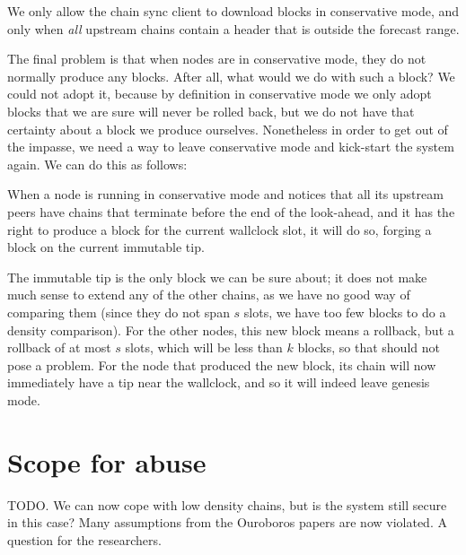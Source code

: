 \begin{definition}
\label{low-density:post-genesis-jump-condition}
We only allow the chain sync client to download blocks in conservative mode, and
only when \emph{all} upstream chains contain a header that is outside the
forecast range.
\end{definition}

The final problem is that when nodes are in conservative mode, they do not
normally produce any blocks. After all, what would we do with such a block?
We could not adopt it, because by definition in conservative mode we only
adopt blocks that we are sure will never be rolled back, but we do not have
that certainty about a block we produce ourselves. Nonetheless in order to
get out of the impasse, we need a way to leave conservative mode and kick-start
the system again. We can do this as follows:

\begin{definition}
When a node is running in conservative mode and notices that all its upstream
peers have chains that terminate before the end of the look-ahead, and it has
the right to produce a block for the current wallclock slot, it will do so,
forging a block on the current immutable tip.
\end{definition}

The immutable tip is the only block we can be sure about; it does not make much
sense to extend any of the other chains, as we have no good way of comparing
them (since they do not span $s$ slots, we have too few blocks to do a density
comparison). For the other nodes, this new block means a rollback, but a
rollback of at most $s$ slots, which will be less than $k$ blocks, so that
should not pose a problem. For the node that produced the new block, its chain
will now immediately have a tip near the wallclock, and so it will indeed leave
genesis mode.


\section{Scope for abuse}

TODO.  We can now cope with low density chains, but is the system
still secure in this case? Many assumptions from the Ouroboros papers are now
violated. A question for the researchers.
